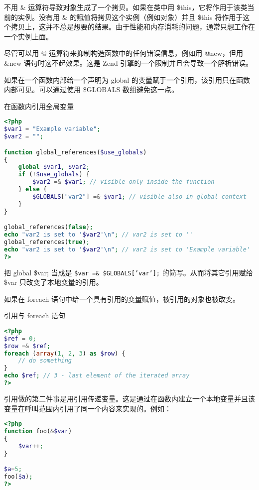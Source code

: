 不用 \& 运算符导致对象生成了一个拷贝。如果在类中用 \$this，它将作用于该类当前的实例。没有用 \& 的赋值将拷贝这个实例（例如对象）并且 \$this 将作用于这个拷贝上，这并不总是想要的结果。由于性能和内存消耗的问题，通常只想工作在一个实例上面。

尽管可以用 @ 运算符来抑制构造函数中的任何错误信息，例如用 @new，但用 \&new 语句时这不起效果。这是 Zend 引擎的一个限制并且会导致一个解析错误。

如果在一个函数内部给一个声明为 global 的变量赋于一个引用，该引用只在函数内部可见。可以通过使用 \$GLOBALS 数组避免这一点。

\begin{example}
在函数内引用全局变量
\begin{lstlisting}[language=PHP]
<?php
$var1 = "Example variable";
$var2 = "";

function global_references($use_globals)
{
    global $var1, $var2;
    if (!$use_globals) {
        $var2 =& $var1; // visible only inside the function
    } else {
        $GLOBALS["var2"] =& $var1; // visible also in global context
    }
}

global_references(false);
echo "var2 is set to '$var2'\n"; // var2 is set to ''
global_references(true);
echo "var2 is set to '$var2'\n"; // var2 is set to 'Example variable'
?>
\end{lstlisting}
\end{example}

把 global \$var; 当成是 \texttt{\$var =\& \$GLOBALS['var'];} 的简写。从而将其它引用赋给 \$var 只改变了本地变量的引用。

如果在 foreach 语句中给一个具有引用的变量赋值，被引用的对象也被改变。



\begin{example}
引用与 foreach 语句
\begin{lstlisting}[language=PHP]
<?php
$ref = 0;
$row =& $ref;
foreach (array(1, 2, 3) as $row) {
    // do something
}
echo $ref; // 3 - last element of the iterated array
?>
\end{lstlisting}
\end{example}

引用做的第二件事是用引用传递变量。这是通过在函数内建立一个本地变量并且该变量在呼叫范围内引用了同一个内容来实现的。例如：


\begin{lstlisting}[language=PHP]
<?php
function foo(&$var)
{
    $var++;
}

$a=5;
foo($a);
?>
\end{lstlisting}

